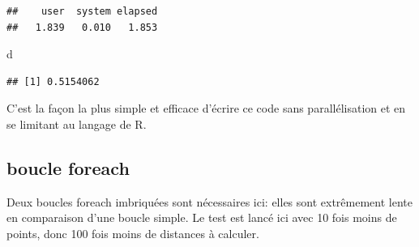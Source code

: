 \documentclass[
  12pt,
  french,
  a4paper,
  extrafontsizes,onecolumn,openright
  ]{memoir}
\newenvironment{Shaded}{\begin{snugshade}}{\end{snugshade}}
\newcommand{\ControlFlowTok}[1]{\textcolor[rgb]{0.13,0.29,0.53}{\textbf{#1}}}
\newcommand{\DataTypeTok}[1]{\textcolor[rgb]{0.13,0.29,0.53}{#1}}
\newcommand{\DecValTok}[1]{\textcolor[rgb]{0.00,0.00,0.81}{#1}}
\newcommand{\KeywordTok}[1]{\textcolor[rgb]{0.13,0.29,0.53}{\textbf{#1}}}
\newcommand{\NormalTok}[1]{#1}
\newcommand{\OperatorTok}[1]{\textcolor[rgb]{0.81,0.36,0.00}{\textbf{#1}}}
\newcommand{\StringTok}[1]{\textcolor[rgb]{0.31,0.60,0.02}{#1}}
\begin{document}
\begin{verbatim}
##    user  system elapsed 
##   1.839   0.010   1.853
\end{verbatim}

\begin{Shaded}
\begin{Highlighting}[]
\NormalTok{d}
\end{Highlighting}
\end{Shaded}

\begin{verbatim}
## [1] 0.5154062
\end{verbatim}

\normalsize
C'est la façon la plus simple et efficace d'écrire ce code sans parallélisation et en se limitant au langage de R.

\hypertarget{boucle-foreach}{%
\subsection{boucle foreach}\label{boucle-foreach}}

Deux boucles foreach imbriquées sont nécessaires ici: elles sont extrêmement lente en comparaison d'une boucle simple.
Le test est lancé ici avec 10 fois moins de points, donc 100 fois moins de distances à calculer.

\scriptsize

\begin{Shaded}
\end{Shaded}
\end{document}
